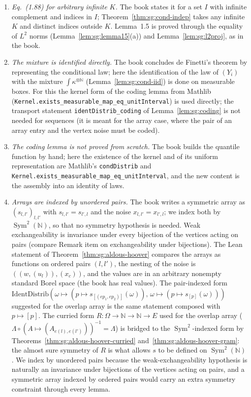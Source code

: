 \begin{remark}
\begin{enumerate}
\item \emph{Eq.~(1.88) for arbitrary infinite $K$.} The book states it for a set $I$ with infinite complement and indices in $I$; Theorem~\ref{thm:sg:cond-indep} takes any infinite $K$ and distinct indices outside $K$. Lemma~1.5 is proved through the equality of $L^2$ norms (Lemma~\ref{lem:sg:lemma15}(a)) and Lemma~\ref{lem:sg:l2proj}, as in the book.
\item \emph{The mixture is identified directly.} The book concludes de Finetti's theorem by representing the conditional law; here the identification of the law of $(Y_i)$ with the mixture $\int\kappa^{\otimes\mathbb N}$ (Lemma~\ref{lem:sg:cond-iid}) is done on measurable boxes. For this the kernel form of the coding lemma from Mathlib (\texttt{Kernel.exists\_measurable\_map\_eq\_unitInterval}) is used directly; the transport statement \texttt{identDistrib\_coding} of Lemma~\ref{lem:sg:coding} is not needed for sequences (it is meant for the array case, where the pair of an array entry and the vertex noise must be coded).
\item \emph{The coding lemma is not proved from scratch.} The book builds the quantile function by hand; here the existence of the kernel and of its uniform representation are Mathlib's \texttt{condDistrib} and \texttt{Kernel.exists\_measurable\_map\_eq\_unitInterval}, and the new content is the assembly into an identity of laws.
\item \emph{Arrays are indexed by unordered pairs.} The book writes a symmetric array as $(s_{l,l'})_{l,l'}$ with $s_{l,l'}=s_{l',l}$ and the noise $x_{l,l'}=x_{l',l}$; we index both by $\operatorname{Sym}^2(\mathbb N)$, so that no symmetry hypothesis is needed. Weak exchangeability is invariance under every bijection of the vertices acting on pairs (compare Remark item on exchangeability under bijections). The Lean statement of Theorem~\ref{thm:sg:aldous-hoover} compares the arrays as functions on ordered pairs $(l,l')$, the nesting of the noise is $((w,(u_l)),(x_c))$, and the values are in an arbitrary nonempty standard Borel space (the book has real values).
The pair-indexed form $\mathrm{IdentDistrib}(\omega\mapsto(p\mapsto s_{[(e p_1,e p_2)]}(\omega)),\,\omega\mapsto(p\mapsto s_{[p]}(\omega)))$ suggested for the overlap array is the same statement composed with $p\mapsto[p]$. The curried form $R:\Omega\to\mathbb N\to\mathbb N\to E$ used for the overlap array ($\Lambda\circ(A\mapsto(A_{e(l),e(l')}))^{-1}=\Lambda$) is bridged to the $\operatorname{Sym}^2$-indexed form by Theorems~\ref{thm:sg:aldous-hoover-curried} and~\ref{thm:sg:aldous-hoover-gram}: the almost sure symmetry of $R$ is what allows $s$ to be defined on $\operatorname{Sym}^2(\mathbb N)$. We index by unordered pairs because the weak-exchangeability hypothesis is naturally an invariance under bijections of the vertices acting on pairs, and a symmetric array indexed by ordered pairs would carry an extra symmetry constraint through every lemma.

\end{enumerate}
\end{remark}
